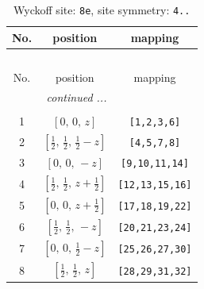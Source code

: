 \documentclass[fleqn,8pt]{jsarticle}
\begin{document}
\renewcommand{\arraystretch}{1.2}
\begin{longtable}{ccc}
\caption{Wyckoff site: {\tt 8e}, site symmetry: {\tt 4..}}
 \\
 \hline \hline
No. & position & mapping \\ \hline \endfirsthead

\multicolumn{2}{l}{\tablename\ \thetable{}} \\
 \hline \hline
No. & position & mapping \\ \hline \endhead

 \hline \hline
\multicolumn{2}{r}{\footnotesize\it continued ...} \\ \endfoot

 \hline \hline
\multicolumn{2}{r}{} \\ \endlastfoot

1 & $\left[ 0,\, 0,\, z \right]$ & {\tt [1,2,3,6]} \\ \hline
2 & $\left[ \frac{1}{2},\, \frac{1}{2},\, \frac{1}{2} - z \right]$ & {\tt [4,5,7,8]} \\ \hline
3 & $\left[ 0,\, 0,\, - z \right]$ & {\tt [9,10,11,14]} \\ \hline
4 & $\left[ \frac{1}{2},\, \frac{1}{2},\, z + \frac{1}{2} \right]$ & {\tt [12,13,15,16]} \\ \hline
5 & $\left[ 0,\, 0,\, z + \frac{1}{2} \right]$ & {\tt [17,18,19,22]} \\ \hline
6 & $\left[ \frac{1}{2},\, \frac{1}{2},\, - z \right]$ & {\tt [20,21,23,24]} \\ \hline
7 & $\left[ 0,\, 0,\, \frac{1}{2} - z \right]$ & {\tt [25,26,27,30]} \\ \hline
8 & $\left[ \frac{1}{2},\, \frac{1}{2},\, z \right]$ & {\tt [28,29,31,32]} \\
\end{longtable}
\renewcommand{\arraystretch}{1.2}
\end{document}
